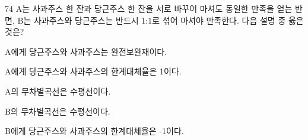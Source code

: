 \begin{question}{74}
A는 사과주스 한 잔과 당근주스 한 잔을 서로 바꾸어 마셔도 동일한 만족을 얻는 반면, B는 사과주스와 당근주스는 반드시 1:1로 섞어 마셔야 만족한다. 다음 설명 중 옳은 것은?
\begin{choices}
  \item A에게 당근주스와 사과주스는 완전보완재이다.
  \item A에게 당근주스와 사과주스의 한계대체율은 1이다.
  \item A의 무차별곡선은 수평선이다.
  \item B의 무차별곡선은 수평선이다.
  \item B에게 당근주스와 사과주스의 한계대체율은 -1이다.
\end{choices}
\end{question}
